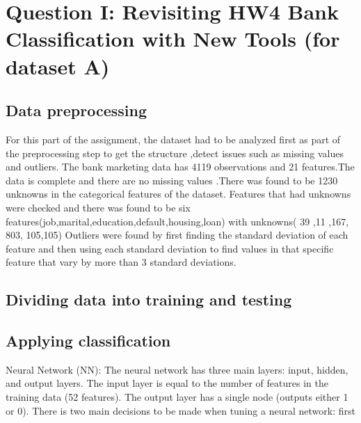\section{Question I: Revisiting HW4 Bank Classification with New Tools (for dataset A)}
\subsection{Data preprocessing}
For this part of the assignment, the dataset had to be analyzed first as part of the preprocessing step to get the structure ,detect issues such as missing values and outliers. The bank marketing data has 4119 observations and 21 features.The data is complete and there are no missing values .There was found to be 1230 unknowns in the categorical features of the dataset. Features that had unknowns were checked and there was found to be six features(job,marital,education,default,housing,loan) with unknowns( 39  ,11 ,167,  803,  105,105) 
Outliers were found by first finding the standard deviation of each feature and then using each standard deviation to find values in that specific feature that vary by more than 3 standard deviations. 

\subsection{Dividing data into training and testing}
 

\subsection{Applying classification}


Neural Network (NN): The neural network has three main layers: input, hidden, and output layers. The input layer is equal to the number of features in the training data (52 features). The output layer has a single node (outputs either 1 or 0). There is two main decisions to be made when tuning a neural network: first




